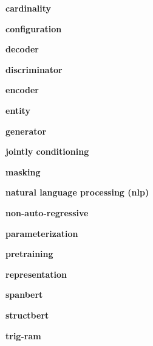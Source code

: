 \begin{multicols*}{2}
{\bf cardinality}
\vspace*{3mm}



{\bf configuration}
\vspace*{3mm}



{\bf decoder}
\vspace*{3mm}



{\bf discriminator}
\vspace*{3mm}



{\bf encoder }
\vspace*{3mm}



{\bf entity }
\vspace*{3mm}



{\bf generator}
\vspace*{3mm}



{\bf jointly conditioning }
\vspace*{3mm}



{\bf masking }
\vspace*{3mm}



{\bf natural language processing (nlp)}
\vspace*{3mm}



{\bf non-auto-regressive }
\vspace*{3mm}



{\bf parameterization}
\vspace*{3mm}



{\bf pretraining}
\vspace*{3mm}



{\bf representation }
\vspace*{3mm}



{\bf spanbert}
\vspace*{3mm}



{\bf structbert}
\vspace*{3mm}



{\bf trig-ram }
\vspace*{3mm}


\end{multicols*}